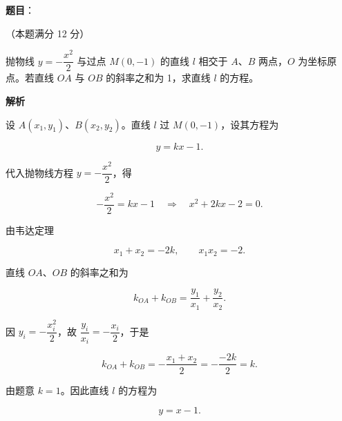 \begin{answer}

\textbf{题目}：

（本题满分 12 分）

抛物线 $y=-\dfrac{x^2}{2}$ 与过点 $M(0,-1)$ 的直线 $l$ 相交于 $A$、$B$ 两点，$O$ 为坐标原点。若直线 $OA$ 与 $OB$ 的斜率之和为 1，求直线 $l$ 的方程。

\textbf{解析}

设 $A(x_1,y_1)$、$B(x_2,y_2)$。直线 $l$ 过 $M(0,-1)$，设其方程为

\nopagebreak[4]
\[
y=kx-1.
\]

代入抛物线方程 $y=-\dfrac{x^2}{2}$，得

\nopagebreak[4]
\[
-\frac{x^2}{2}=kx-1 \quad\Longrightarrow\quad x^2+2kx-2=0.
\]

由韦达定理

\nopagebreak[4]
\[
x_1+x_2=-2k,\qquad x_1x_2=-2.
\]

直线 $OA$、$OB$ 的斜率之和为

\nopagebreak[4]
\[
k_{OA}+k_{OB}=\frac{y_1}{x_1}+\frac{y_2}{x_2}.
\]

因 $y_i=-\dfrac{x_i^2}{2}$，故 $\dfrac{y_i}{x_i}=-\dfrac{x_i}{2}$，于是

\nopagebreak[4]
\[
k_{OA}+k_{OB}=-\frac{x_1+x_2}{2}
=-\frac{-2k}{2}=k.
\]

由题意 $k=1$。因此直线 $l$ 的方程为

\nopagebreak[4]
\[
y=x-1.
\]


\end{answer}

